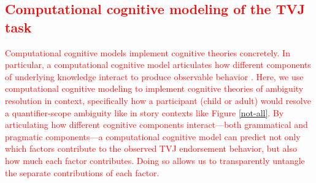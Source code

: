 \documentclass[preprint,authoryear]{elsarticle}\frenchspacing
\newcommand{\gcs}[1]{\ifcomments{\textcolor{blue}{[gcs: #1]}}\fi}
\newcommand{\lsp}[1]{\textcolor{red}{[lsp: #1]}}
\newcommand{\lp}[1]{\textcolor{red}{#1}} %
\begin{document}
\subsection{\lp{Computational cognitive modeling of the TVJ task}}

\lp{Computational cognitive models implement cognitive theories concretely. In particular, a computational cognitive model articulates how different components of underlying knowledge interact to produce observable behavior \citep[e.g.,][]{pearlsprouse2013,goodmanfrank2016,pearlmis2016,pearl2017,pearletal2017,pearl2018chapter, pearlsprouse2018linking, scontrasetalproblang}\gcs{the in-press citation is wonky}.
Here, we use computational cognitive modeling to implement cognitive theories of ambiguity resolution in context, specifically how a participant (child or adult) would resolve a quantifier-scope ambiguity like \Last in story contexts like Figure \ref{not-all}.
By articulating how different cognitive components interact---both grammatical and pragmatic components---a computational cognitive model can predict not only which factors contribute to the observed TVJ endorsement behavior, but also how much each factor contributes.
Doing so allows us to transparently untangle the separate contributions of each factor.}
\end{document}
